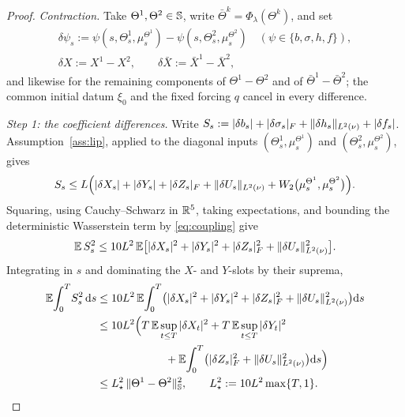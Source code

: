 \begin{proof}
\emph{Contraction.} Take $\Theta^1,\Theta^2\in\mathbb{S}$, write $\bar\Theta^k=\Phi_\lambda(\Theta^k)$,
and set
\[
\begin{gathered}
\delta\psi_s:=\psi(s,\Theta^1_s,\mu^{\Theta^1}_s)-\psi(s,\Theta^2_s,\mu^{\Theta^2}_s)
\quad(\psi\in\{b,\sigma,h,f\}),\\[0.4ex]
\delta X:=X^1-X^2,\qquad \delta\bar X:=\bar X^1-\bar X^2 ,
\end{gathered}
\]
and likewise for the remaining components of $\Theta^1-\Theta^2$ and of
$\bar\Theta^1-\bar\Theta^2$; the common initial datum $\xi_0$ and
the fixed forcing $q$ cancel in every difference.

\emph{Step 1: the coefficient differences.} Write
$S_s:=|\delta b_s|+|\delta\sigma_s|_F+\lVert \delta h_s\rVert_{L^2(\nu)}+|\delta f_s|$. Assumption~\ref{ass:lip},
applied to the diagonal inputs $(\Theta^1_s,\mu^{\Theta^1}_s)$ and $(\Theta^2_s,\mu^{\Theta^2}_s)$,
gives
\[
S_s\le L\Big(|\delta X_s|+|\delta Y_s|+|\delta Z_s|_F+\lVert \delta U_s\rVert_{L^2(\nu)}
+W_2\big(\mu^{\Theta^1}_s,\mu^{\Theta^2}_s\big)\Big) .
\]
Squaring, using Cauchy--Schwarz in $\mathbb{R}^5$, taking expectations, and bounding the deterministic
Wasserstein term by \eqref{eq:coupling} give
\[
\mathbb{E}\,S_s^2\le 10L^2\,\mathbb{E}\big[|\delta X_s|^2+|\delta Y_s|^2+|\delta Z_s|_F^2+\lVert \delta U_s\rVert_{L^2(\nu)}^2\big].
\]
Integrating in $s$ and dominating the $X$- and $Y$-slots by their suprema,
\begin{equation}\label{eq:coeffdiff}
\begin{aligned}
\mathbb{E}\!\int_0^T\! S_s^2\,\mathrm{d} s
&\le 10L^2\,\mathbb{E}\!\int_0^T\!\big(|\delta X_s|^2+|\delta Y_s|^2+|\delta Z_s|_F^2+\lVert \delta U_s\rVert_{L^2(\nu)}^2\big)\mathrm{d} s\\
&\le 10L^2\Big(T\,\mathbb{E}\sup_{t\le T}|\delta X_t|^2+T\,\mathbb{E}\sup_{t\le T}|\delta Y_t|^2\\
&\hspace{6.2em}+\mathbb{E}\!\int_0^T\!\big(|\delta Z_s|_F^2+\lVert \delta U_s\rVert_{L^2(\nu)}^2\big)\mathrm{d} s\Big)\\
&\le L_\star^2\,\|\Theta^1-\Theta^2\|_{\mathbb{S}}^2 ,
\qquad L_\star^2:=10L^2\max\{T,1\} .
\end{aligned}
\end{equation}


\end{proof}
